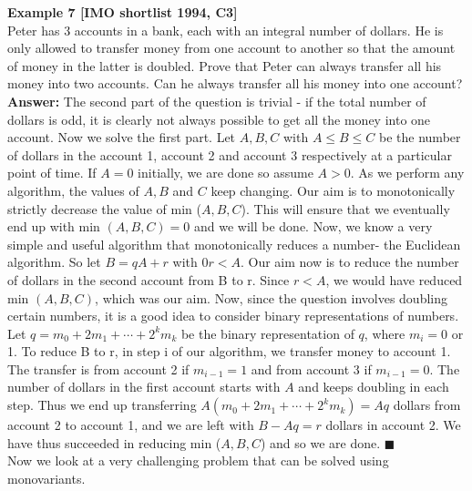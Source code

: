 \documentclass[a4paper,11pt]{book}
\begin{document}
\textbf{ Example 7 [IMO shortlist 1994, C3]}\\
Peter has 3 accounts in a bank, each with an integral number of
dollars. He is only allowed to transfer money from one account to
another so that the amount of money in the latter is doubled.
Prove that Peter can always transfer all his money into two
accounts. Can he always transfer all his money into one account?\\

\textbf{ Answer:}
The second part of the question is trivial - if the total number of dollars is odd, it is clearly not always possible to get all the money into one account. Now we solve the first part. Let $ A, B, C$ with $A \le B \le C$ be the number of dollars in the account 1, account 2 and account 3 respectively at a particular point of time. If $A = 0$ initially, we are done so assume $A > 0$. As we perform any algorithm, the values of $A, B$ and $C$ keep changing. Our aim is to monotonically strictly decrease the value of min ($A, B, C$). This will ensure that we eventually end up with min $(A, B, C) = 0$ and we
will be done. Now, we know a very simple and useful algorithm
that monotonically reduces a number- the Euclidean algorithm. So
let $B = qA + r$ with $0 r < A$. Our aim now is to reduce the number
of dollars in the second account from B to r. Since $r < A$, we would
have reduced min $(A, B, C)$, which was our aim.
Now, since the question involves doubling certain numbers, it
is a good idea to consider binary representations of numbers. Let
$q = m_0 + 2m_1 + \cdots + 2^{k}m_{k}$ be the binary representation of $q$, where
$m_i = 0$ or 1. To reduce B to r, in step i of our algorithm, we transfer
money to account 1. The transfer is from account 2 if $m_{i-1} = 1$ and
from account 3 if $m_{i-1} = 0$. The number of dollars in the first
account starts with $A$ and keeps doubling in each step. Thus we
end up transferring $A(m_0 + 2m_1 + \cdots + 2^{k}m_{k}) = Aq$ dollars from
account 2 to account 1, and we are left with $B-Aq = r$ dollars in
account 2. We have thus succeeded in reducing min ($A, B, C$) and
so we are done. \hfill $\blacksquare$\\

Now we look at a very challenging problem that can be solved
using monovariants.\\
\end{document}
